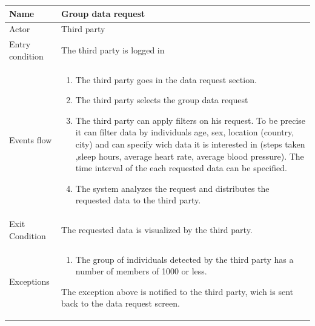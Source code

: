 \begin{tabular}{|l|p{11cm}|}
    \hline
    Name & Group data request
    \\ \hline
    Actor & Third party
    \\ \hline 
    Entry condition & The third party is logged in
        \\ \hline
    Events flow &
    \begin{enumerate}
    \item The third party goes in the data request section.
    \item The third party selects the group data request
	\item The third party can apply filters on his request. To be precise it can filter data by individuals age, sex, location (country, city) and can specify wich data it is interested in (steps taken ,sleep hours, average heart rate, average blood pressure). The time interval of the each requested data can be specified.
	\item The system analyzes the request and distributes the requested data to the third party.
    \end{enumerate}
     \\ \hline
     Exit Condition & The requested data is visualized by the third party.
     \\
    \hline
    Exceptions &
        \begin{enumerate}
    \item The group of individuals detected by the third party has a number of members of 1000 or less.     
    \end{enumerate}
      The exception above is notified to the third party, wich is sent back to the data request screen.
	 \\
    \hline
\end{tabular}


  

